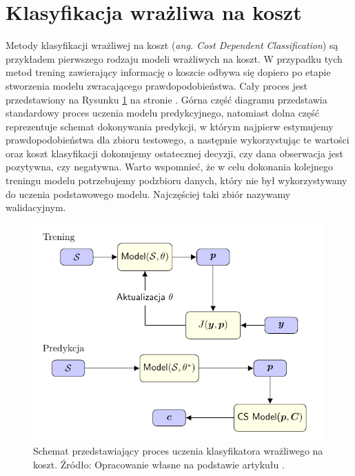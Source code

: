 \documentclass[inzynierska]{pwr_wmat_praca_dyplomowa}
\theoremstyle{plain}
\numberwithin{theorem}{chapter}
\theoremstyle{definition}
\numberwithin{theorem}{chapter}
\begin{document}
\section{Klasyfikacja wrażliwa na koszt}
Metody klasyfikacji wrażliwej na koszt (\textit{ang. Cost Dependent Classification})  są przykładem pierwszego rodzaju modeli wrażliwych na koszt. W przypadku tych metod trening zawierający informację o koszcie odbywa się dopiero po etapie stworzenia modelu zwracającego prawdopodobieństwa. Cały proces jest przedstawiony na Rysunku \ref{cdc} na stronie \pageref{cdc}. Górna część diagramu przedstawia standardowy proces uczenia modelu predykcyjnego, natomiast dolna część reprezentuje schemat dokonywania predykcji, w którym najpierw estymujemy prawdopodobieństwa dla zbioru testowego, a następnie wykorzystując te wartości oraz koszt klasyfikacji dokonujemy ostatecznej decyzji, czy dana obserwacja jest pozytywna, czy negatywna. Warto wspomnieć, że w celu dokonania kolejnego treningu modelu potrzebujemy podzbioru danych, który nie był wykorzystywany do uczenia podstawowego modelu. Najczęściej taki zbiór nazywamy walidacyjnym.
\begin{figure}[h]
	\includegraphics[width=\linewidth]{plots/cost_sensitive_classification.pdf}
	\caption{Schemat przedstawiający proces uczenia klasyfikatora wrażliwego na koszt. Źródło: Opracowanie własne na podstawie artykułu \cite{RMoser}.}
	\label{cdc}
\end{figure}
\end{document}
